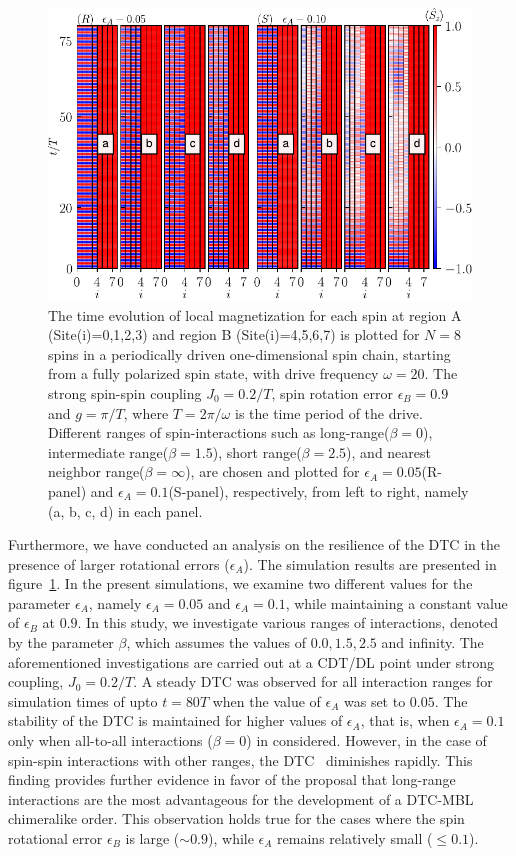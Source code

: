 \documentclass[12pt]{iopart}
\begin{document}
\begin{figure}[t]
\centering
\hspace{1.5cm}\includegraphics[width=12cm]{figure6.pdf}
\caption{The time evolution of local magnetization for each spin at region A (Site(i)=0,1,2,3) and region B (Site(i)=4,5,6,7) is plotted for $N=8$ spins in a periodically driven one-dimensional spin chain, starting from a fully polarized spin state, with drive frequency $\omega=20$. The strong spin-spin coupling $J_0 = 0.2/T$, spin rotation error $\epsilon_B = 0.9$ and $g=\pi/T$, where $T=2\pi/\omega$ is the time period of the drive.  Different ranges of spin-interactions such as long-range($\beta=0$), intermediate range($\beta=1.5$), short range($\beta=2.5$), and nearest neighbor range($\beta=\infty$), are chosen and plotted  for $\epsilon_A =0.05$(R-panel) and $\epsilon_A =0.1$(S-panel), respectively, from left to right, namely (a, b, c, d) in each panel.}
\label{Fig:ea}
\end{figure}
Furthermore, we have conducted an analysis on the resilience of the DTC in the presence of larger rotational errors ($\epsilon_A$). The simulation results are presented in figure~\ref{Fig:ea}. In the present simulations, we examine two different values for the parameter $\epsilon_A$, namely $\epsilon_A = 0.05$ and $\epsilon_A = 0.1$, while maintaining a constant value of $\epsilon_B$ at $0.9$. In this study, we investigate various ranges of interactions, denoted by the parameter $\beta$, which assumes the values of $0.0, 1.5, 2.5$ and infinity. The aforementioned investigations are carried out at a CDT/DL point under strong coupling, $J_0 = 0.2/T$.  A steady DTC was observed for all interaction ranges for simulation times of upto $t=80T$ when the value of $\epsilon_A$ was set to $0.05$. The stability of the DTC is maintained for higher values of $\epsilon_A$, that is, when $\epsilon_A = 0.1$ only when all-to-all interactions ($\beta=0$) in considered. However, in the case of spin-spin interactions with other ranges, the DTC  diminishes rapidly. This finding provides further evidence in favor of the proposal that long-range interactions are the most advantageous for the development of a DTC-MBL chimeralike order. This observation holds true for the cases where the spin rotational error $\epsilon_B$ is large ($\sim 0.9$), while $\epsilon_A$ remains relatively small ($\le 0.1$).
\end{document}
